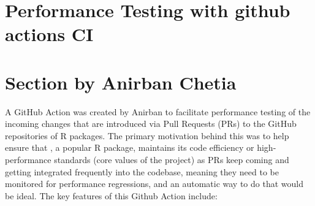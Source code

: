 \section{Performance Testing with github actions CI}
\section{Section by Anirban Chetia}

A GitHub Action was created by Anirban to facilitate performance testing of the incoming changes that are introduced via Pull Requests (PRs) to the GitHub repositories of R packages. The primary motivation behind this was to help ensure that , a popular R package, maintains its code efficiency or high-performance standards (core values of the project) as PRs keep coming and getting integrated frequently into the codebase, meaning they need to be monitored for performance regressions, and an automatic way to do that would be ideal.
\newline
\newline
The key features of this Github Action include:
